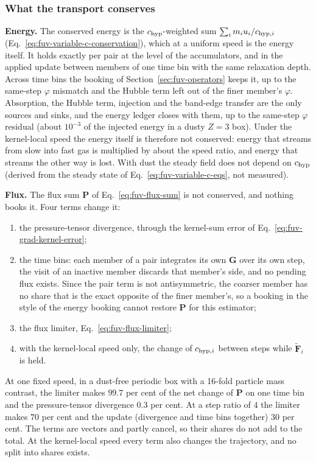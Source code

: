 \subsubsection{What the transport conserves}
\label{sec:fuv-flux-conservation}

\textbf{Energy.} The conserved energy is the $c_{\rm hyp}$-weighted sum
$\sum_i m_i u_i/c_{{\rm hyp},i}$ (Eq.~\ref{eq:fuv-variable-c-conservation}),
which at a uniform speed is the energy itself. It holds exactly per pair
at the level of the accumulators, and in the applied update between
members of one time bin with the same relaxation depth. Across time bins
the booking of Section~\ref{sec:fuv-operators} keeps it, up to the
same-step $\varphi$ mismatch and the Hubble term left out of the finer
member's $\varphi$. Absorption, the Hubble term, injection and the
band-edge transfer are the only sources and sinks, and the energy ledger
closes with them, up to the same-step $\varphi$ residual (about
$10^{-3}$ of the injected energy in a dusty $Z=3$ box). Under the kernel-local speed the energy itself is
therefore not conserved: energy that streams from slow into fast gas is
multiplied by about the speed ratio, and energy that streams the other
way is lost. With dust the steady field does not depend on
$c_{\rm hyp}$ (derived from the steady state of
Eq.~\ref{eq:fuv-variable-c-eqs}, not measured).

\textbf{Flux.} The flux sum $\mathbf P$ of Eq.~\ref{eq:fuv-flux-sum} is
not conserved, and nothing books it. Four terms change it:
\begin{enumerate}
  \item the pressure-tensor divergence, through the kernel-sum error of
    Eq.~\ref{eq:fuv-grad-kernel-error};
  \item the time bins: each member of a pair integrates its own
    $\mathbf G$ over its own step, the visit of an inactive member
    discards that member's side, and no pending flux exists. Since the
    pair term is not antisymmetric, the coarser member has no share that
    is the exact opposite of the finer member's, so a booking in the
    style of the energy booking cannot restore $\mathbf P$ for this
    estimator;
  \item the flux limiter, Eq.~\ref{eq:fuv-flux-limiter};
  \item with the kernel-local speed only, the change of $c_{{\rm hyp},i}$
    between steps while $\tilde{\mathbf F}_i$ is held.
\end{enumerate}
At one fixed speed, in a dust-free periodic box with a 16-fold particle
mass contrast, the limiter makes $99.7$ per cent of the net change of
$\mathbf P$ on one time bin and the pressure-tensor divergence
$0.3$ per cent. At a step ratio of $4$ the limiter makes $70$ per cent
and the update (divergence and time bins together) $30$ per cent. The
terms are vectors and partly cancel, so their shares do not add to the
total. At the kernel-local speed every term also changes the trajectory,
and no split into shares exists.

